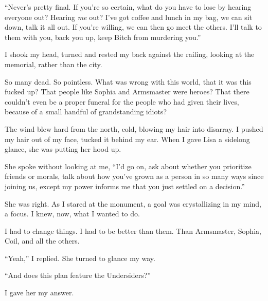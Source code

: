 ``Never's pretty final.  If you're so certain, what do you have to lose by hearing everyone out?  Hearing \emph{me} out?  I've got coffee and lunch in my bag, we can sit down, talk it all out.  If you're willing, we can then go meet the others.  I'll talk to them with you, back you up, keep Bitch from murdering you.''



I shook my head, turned and rested my back against the railing, looking at the memorial, rather than the city.



So many dead.  So pointless.  What was wrong with this world, that it was this fucked up?  That people like Sophia and Armsmaster were heroes?  That there couldn't even be a proper funeral for the people who had given their lives, because of a small handful of grandstanding idiots?



The wind blew hard from the north, cold, blowing my hair into disarray.  I pushed my hair out of my face, tucked it behind my ear.  When I gave Lisa a sidelong glance, she was putting her hood up.



She spoke without looking at me, ``I'd go on, ask about whether you prioritize friends or morals, talk about how you've grown as a person in so many ways since joining us, except my power informs me that you just settled on a decision.''



She was right.  As I stared at the monument, a goal was crystallizing in my mind, a focus.  I knew, now, what I wanted to do.



I had to change things.  I had to be better than them.  Than Armsmaster, Sophia, Coil, and all the others.



``Yeah,'' I replied.  She turned to glance my way.



``And does this plan feature the Undersiders?''



I gave her my answer.





